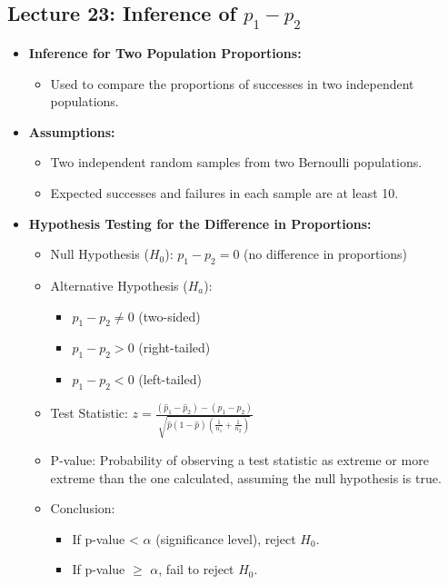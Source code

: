 \documentclass{article}
\begin{document}
\begin{multicols}{2}
\section*{Lecture 23: Inference of $p_1 - p_2$}

\begin{itemize}
\item \textbf{Inference for Two Population Proportions:}
    \begin{itemize}
        \item Used to compare the proportions of successes in two independent populations.
    \end{itemize}
\item \textbf{Assumptions:}
    \begin{itemize}
        \item Two independent random samples from two Bernoulli populations.
        \item Expected successes and failures in each sample are at least 10.
    \end{itemize}
\item \textbf{Hypothesis Testing for the Difference in Proportions:}
    \begin{itemize}
        \item Null Hypothesis ($H_0$): $p_1 - p_2 = 0$ (no difference in proportions)
        \item Alternative Hypothesis ($H_a$): 
            \begin{itemize}
                \item $p_1 - p_2 \ne 0$ (two-sided)
                \item $p_1 - p_2 > 0$ (right-tailed)
                \item $p_1 - p_2 < 0$ (left-tailed)
            \end{itemize}
        \item Test Statistic: $z = \frac{(\hat{p}_1 - \hat{p}_2) - (p_1 - p_2)}{\sqrt{\hat{p}(1-\hat{p})(\frac{1}{n_1} + \frac{1}{n_2})}}$
        \item P-value: Probability of observing a test statistic as extreme or more extreme than the one calculated, assuming the null hypothesis is true.
        \item Conclusion:
            \begin{itemize}
                \item If p-value < $\alpha$ (significance level), reject $H_0$.
                \item If p-value $\ge$ $\alpha$, fail to reject $H_0$.

\end{itemize}
\end{itemize}
\end{itemize}
\end{multicols}
\end{document}
